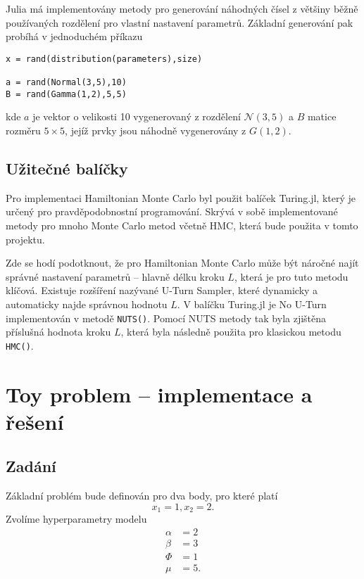 \documentclass[11pt,oneside,american,czech]{article}
\newcommand{\N}{\mathcal{N}}
\begin{document}
Julia má implementovány metody pro generování náhodných čísel z většiny běžně používaných rozdělení pro vlastní nastavení parametrů. Základní generování pak probíhá v jednoduchém příkazu

\begin{lstlisting}
x = rand(distribution(parameters),size)

a = rand(Normal(3,5),10)
B = rand(Gamma(1,2),5,5)
\end{lstlisting}

kde $a$ je vektor o velikosti 10 vygenerovaný z rozdělení $\N(3,5)$ a $B$ matice rozměru $5 \times 5$, jejíž prvky jsou náhodně vygenerovány z $G(1,2)$.

\subsection{Užitečné balíčky}

Pro implementaci Hamiltonian Monte Carlo byl použit balíček Turing.jl, který je určený pro pravděpodobnostní programování. Skrývá v sobě implementované metody pro mnoho Monte Carlo metod včetně HMC, která bude použita v tomto projektu.

Zde se hodí podotknout, že pro Hamiltonian Monte Carlo může být náročné najít správné nastavení parametrů -- hlavně délku kroku $L$, která je pro tuto metodu klíčová. Existuje rozšíření nazývané U-Turn Sampler, které dynamicky a automaticky najde správnou hodnotu $L$. V balíčku Turing.jl je No U-Turn implementován v metodě \verb|NUTS()|. Pomocí NUTS metody tak byla zjištěna příslušná hodnota kroku $L$, která byla následně použita pro klasickou metodu \verb|HMC()|.

\section{Toy problem -- implementace a řešení}
\subsection{Zadání}

Základní problém bude definován pro dva body, pro které platí
\begin{equation*}
	x_1 = 1, x_2 = 2.
\end{equation*}
Zvolíme hyperparametry modelu
\begin{align*}
	\alpha & = 2 \\
	\beta & = 3 \\
	\Phi & = 1 \\
	\mu & = 5.
\end{align*}
\end{document}
